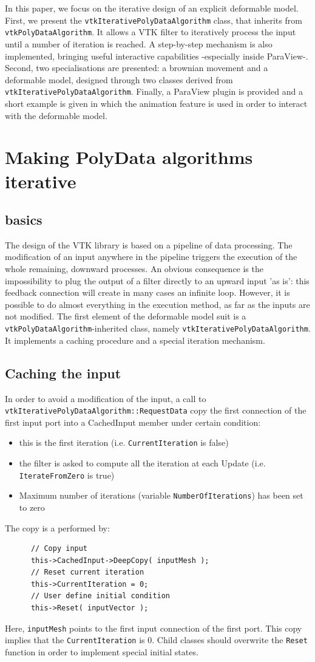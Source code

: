 \documentclass{InsightArticle}
\begin{document}
In this paper, we focus on the iterative design of an explicit deformable 
model. First, we present the \verb!vtkIterativePolyDataAlgorithm! class, that 
inherits from \verb!vtkPolyDataAlgorithm!. It allows a VTK filter to iteratively
process the input until a number of iteration is reached. A step-by-step
mechanism is also implemented, bringing useful interactive capabilities
-especially inside ParaView-. Second, two specialisations are presented: a 
brownian movement and a deformable model, designed through two classes derived 
from \verb!vtkIterativePolyDataAlgorithm!. Finally, a ParaView plugin is 
provided and a short example is given in which the animation feature is used in 
order to interact with the deformable model.
%
\section{Making PolyData algorithms iterative}
%
\subsection{basics}
The design of the VTK library is based on a pipeline of data processing. The
modification of an input anywhere in the pipeline triggers the execution of the
whole remaining, downward processes. An obvious consequence is the 
impossibility to plug the output of a filter directly to an upward input 
'as is': this feedback connection will create in many cases an infinite loop.
However, it is possible to do almost everything in the execution method, as far
as the inputs are not modified. The first element of the deformable model suit
is a \verb!vtkPolyDataAlgorithm!-inherited class, namely 
\verb!vtkIterativePolyDataAlgorithm!. It implements a caching procedure and a 
special iteration mechanism.
%
\subsection{Caching the input}
%
In order to avoid a modification of the input, a call to 
\verb!vtkIterativePolyDataAlgorithm::RequestData! copy the first connection of 
the first input port into a CachedInput member under certain condition:
\begin{itemize}
 \item this is the first iteration (i.e. \verb!CurrentIteration! is false)
 \item the filter is asked to compute all the iteration at each Update (i.e.
   \verb!IterateFromZero! is true)
 \item Maximum number of iterations (variable \verb!NumberOfIterations!) has 
been set to zero
\end{itemize}
The copy is a performed by:
\begin{verbatim}
      // Copy input
      this->CachedInput->DeepCopy( inputMesh );
      // Reset current iteration
      this->CurrentIteration = 0;
      // User define initial condition
      this->Reset( inputVector ); 
\end{verbatim}
%
Here, \verb!inputMesh! points to the first input connection of the first port.
This copy implies that the \verb!CurrentIteration! is 0. Child classes should
overwrite the \verb!Reset! function in order to implement special initial 
states.
%
\end{document}
